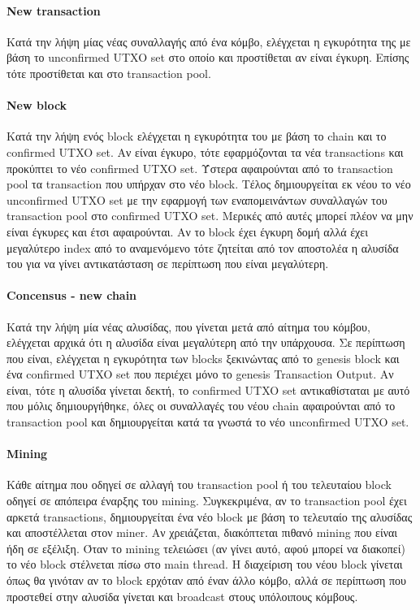 \documentclass[a4paper,oneside, 12pt]{article}
\begin{document}
\paragraph{New transaction}
Κατά την λήψη μίας νέας συναλλαγής από ένα κόμβο, ελέγχεται η εγκυρότητα της με βάση το unconfirmed UTXO set στο οποίο και προστίθεται αν είναι έγκυρη. Επίσης τότε προστίθεται και στο transaction pool.

\paragraph{New block}
Κατά την λήψη ενός block ελέγχεται η εγκυρότητα του με βάση το chain και το confirmed UTXO set.
Αν είναι έγκυρο, τότε εφαρμόζονται τα νέα transactions και προκύπτει το νέο confirmed UTXO set.
Ύστερα αφαιρούνται από το transaction pool τα transaction που υπήρχαν στο νέο block.
Τέλος δημιουργείται εκ νέου το νέο unconfirmed UTXO set με την εφαρμογή των εναπομεινάντων συναλλαγών του transaction pool στο confirmed UTXO set. Μερικές από αυτές μπορεί πλέον να μην είναι έγκυρες και έτσι αφαιρούνται.
Αν το block έχει έγκυρη δομή αλλά έχει μεγαλύτερο index από το αναμενόμενο τότε ζητείται από τον αποστολέα η αλυσίδα του για να γίνει αντικατάσταση σε περίπτωση που είναι μεγαλύτερη.

\paragraph{Concensus - new chain}
Κατά την λήψη μία νέας αλυσίδας, που γίνεται μετά από αίτημα του κόμβου, ελέγχεται αρχικά ότι η αλυσίδα είναι μεγαλύτερη από την υπάρχουσα. Σε περίπτωση που είναι, ελέγχεται η εγκυρότητα των blocks ξεκινώντας από το genesis block και ένα confirmed UTXO set που περιέχει μόνο το genesis Transaction Output. Αν είναι, τότε η αλυσίδα γίνεται δεκτή, το confirmed UTXO set αντικαθίσταται με αυτό που μόλις δημιουργήθηκε, όλες οι συναλλαγές του νέου chain αφαιρούνται από το transaction pool και δημιουργείται κατά τα γνωστά το νέο unconfirmed UTXO set.

\paragraph{Mining}
Κάθε αίτημα που οδηγεί σε αλλαγή του transaction pool ή του τελευταίου block οδηγεί σε απόπειρα έναρξης του mining. Συγκεκριμένα, αν το transaction pool έχει αρκετά transactions, δημιουργείται ένα νέο block με βάση το τελευταίο της αλυσίδας και αποστέλλεται στον miner. Αν χρειάζεται, διακόπτεται πιθανό mining που είναι ήδη σε εξέλιξη. Όταν το mining τελειώσει (αν γίνει αυτό, αφού μπορεί να διακοπεί) το νέο block στέλνεται πίσω στο main thread. Η διαχείριση του νέου block γίνεται όπως θα γινόταν αν το block ερχόταν από έναν άλλο κόμβο, αλλά σε περίπτωση που προστεθεί στην αλυσίδα γίνεται και broadcast στους υπόλοιπους κόμβους.
\end{document}
